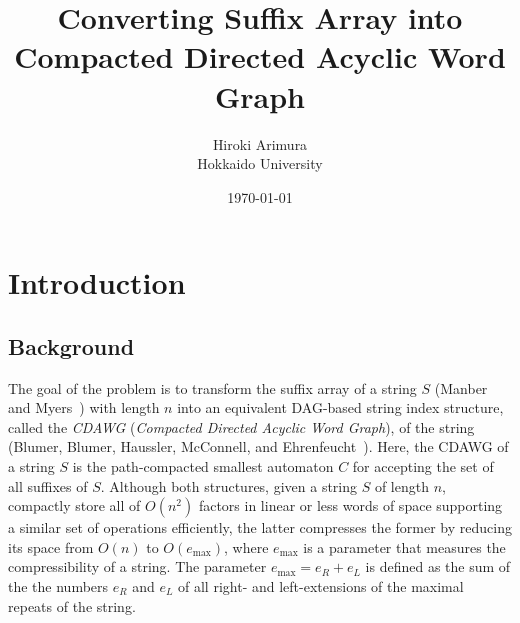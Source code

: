 \documentclass{article}
\title{
Converting Suffix Array into Compacted Directed Acyclic Word Graph
}
\author{Hiroki Arimura\\
Hokkaido University
}
\date{\today}
\begin{document}
\maketitle

\begin{abstract}
\end{abstract}


\section{Introduction}
\label{sec:intro}

\subsection{Background}
The goal of the problem is to transform the suffix array of a string $S$ (Manber and Myers~\cite{manber:myers1993suffixarrays}) with length $n$ into an equivalent DAG-based string index structure, called the \textit{CDAWG} (\textit{Compacted Directed Acyclic Word Graph}), of the string (Blumer, Blumer, Haussler, McConnell, and Ehrenfeucht~\cite{blumer1987complete}). Here, the CDAWG of a string $S$ is the path-compacted smallest automaton $C$ for accepting the set of all suffixes of $S$.
Although both structures, given a string $S$ of length $n$, compactly
store all of $O(n^2)$ factors in linear or less words of space supporting a similar set of operations efficiently, the latter compresses the former by reducing its space from $O(n)$ to $O(e_{\max})$, where $e_{\max}$ is a parameter that measures the compressibility of a string. The parameter $e_{\max} = e_R + e_L$ is defined as the sum of the the numbers $e_R$ and $e_L$ of all right- and left-extensions of the maximal repeats of the string.
\end{document}
